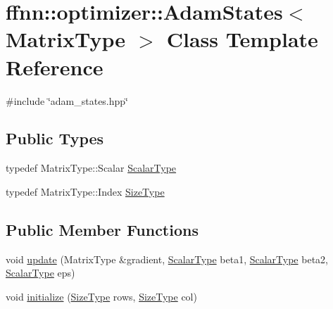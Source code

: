 \hypertarget{classffnn_1_1optimizer_1_1_adam_states}{\section{ffnn\-:\-:optimizer\-:\-:Adam\-States$<$ Matrix\-Type $>$ Class Template Reference}
\label{classffnn_1_1optimizer_1_1_adam_states}
}


{\ttfamily \#include \char`\"{}adam\-\_\-states.\-hpp\char`\"{}}

\subsection*{Public Types}
\begin{DoxyCompactItemize}
\item 
typedef Matrix\-Type\-::\-Scalar \hyperlink{classffnn_1_1optimizer_1_1_adam_states_a101ae88e46a38141a8fcf99a5382d448}{Scalar\-Type}
\item 
typedef Matrix\-Type\-::\-Index \hyperlink{classffnn_1_1optimizer_1_1_adam_states_a02c5c9a4b2a5689061570f493e842f0b}{Size\-Type}
\end{DoxyCompactItemize}
\subsection*{Public Member Functions}
\begin{DoxyCompactItemize}
\item 
void \hyperlink{classffnn_1_1optimizer_1_1_adam_states_ac33f6872ccbbdaa0b38c000df76f42a5}{update} (Matrix\-Type \&gradient, \hyperlink{classffnn_1_1optimizer_1_1_adam_states_a101ae88e46a38141a8fcf99a5382d448}{Scalar\-Type} beta1, \hyperlink{classffnn_1_1optimizer_1_1_adam_states_a101ae88e46a38141a8fcf99a5382d448}{Scalar\-Type} beta2, \hyperlink{classffnn_1_1optimizer_1_1_adam_states_a101ae88e46a38141a8fcf99a5382d448}{Scalar\-Type} eps)
\item 
void \hyperlink{classffnn_1_1optimizer_1_1_adam_states_a37cb508c7d60d1df86cab12254596055}{initialize} (\hyperlink{classffnn_1_1optimizer_1_1_adam_states_a02c5c9a4b2a5689061570f493e842f0b}{Size\-Type} rows, \hyperlink{classffnn_1_1optimizer_1_1_adam_states_a02c5c9a4b2a5689061570f493e842f0b}{Size\-Type} col)
\end{DoxyCompactItemize}


